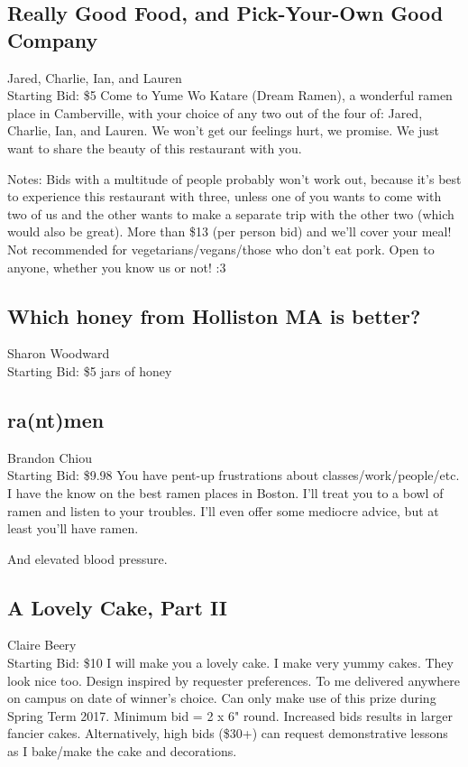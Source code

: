 \documentclass[11pt]{article}
\begin{document}
\subsection{Really Good Food, and Pick-Your-Own Good Company}
Jared, Charlie, Ian, and Lauren
\\
Starting Bid: \$5
\newline
Come to Yume Wo Katare (Dream Ramen), a wonderful ramen place in Camberville, with your choice of any two out of the four of: Jared, Charlie, Ian, and Lauren. We won't get our feelings hurt, we promise. We just want to share the beauty of this restaurant with you. 

Notes: Bids with a multitude of people probably won't work out, because it's best to experience this restaurant with three, unless one of you wants to come with two of us and the other wants to make a separate trip with the other two (which would also be great). More than \$13 (per person bid) and we'll cover your meal! Not recommended for vegetarians/vegans/those who don't eat pork. Open to anyone, whether you know us or not! :3
\subsection{Which honey from Holliston MA is better?}
Sharon Woodward
\\
Starting Bid: \$5
 jars of honey
\subsection{ra(nt)men}
Brandon Chiou
\\
Starting Bid: \$9.98
\newline
You have pent-up frustrations about classes/work/people/etc. I have the know on the best ramen places in Boston. I'll treat you to a bowl of ramen and listen to your troubles. I'll even offer some mediocre advice, but at least you'll have ramen.

And elevated blood pressure.
\subsection{A Lovely Cake, Part II}
Claire Beery
\\
Starting Bid: \$10
\newline
I will make you a lovely cake. I make very yummy cakes. They look nice too. Design inspired by requester preferences. To me delivered anywhere on campus on date of winner's choice. Can only make use of this prize during Spring Term 2017. Minimum bid = 2 x 6" round. Increased bids results in larger fancier cakes. Alternatively, high bids (\$30+) can request demonstrative lessons as I bake/make the cake and decorations.
\end{document}
